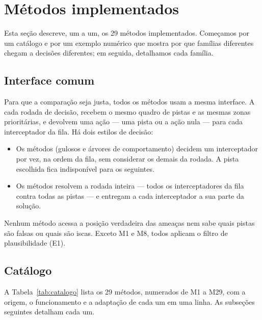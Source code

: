 \section{Métodos implementados}\label{sec:metodos}

Esta seção descreve, um a um, os 29 métodos implementados. Começamos por um catálogo e por um exemplo numérico que
mostra por que famílias diferentes chegam a decisões diferentes; em seguida, detalhamos cada família.

\subsection{Interface comum}
Para que a comparação seja justa, todos os métodos usam a mesma interface. A cada rodada de decisão, recebem o mesmo
quadro de pistas e as mesmas zonas prioritárias, e devolvem uma ação --- uma pista ou a ação nula --- para cada
interceptador da fila. Há dois estilos de decisão:
\begin{itemize}
  \item Os métodos  (gulosos e árvores de comportamento) decidem um interceptador por vez, na ordem
        da fila, sem considerar os demais da rodada. A pista escolhida fica indisponível para os seguintes.
  \item Os métodos  resolvem a rodada inteira --- todos os interceptadores da fila contra todas as
        pistas --- e entregam a cada interceptador a sua parte da solução.
\end{itemize}
Nenhum método acessa a posição verdadeira das ameaças nem sabe quais pistas são falsas ou quais são iscas. Exceto M1 e M8, todos aplicam o
filtro de plausibilidade (E1).

\subsection{Catálogo}
A Tabela~\ref{tab:catalogo} lista os 29 métodos, numerados de M1 a M29, com a origem, o funcionamento e a adaptação de
cada um em uma linha. As subseções seguintes detalham cada um.

